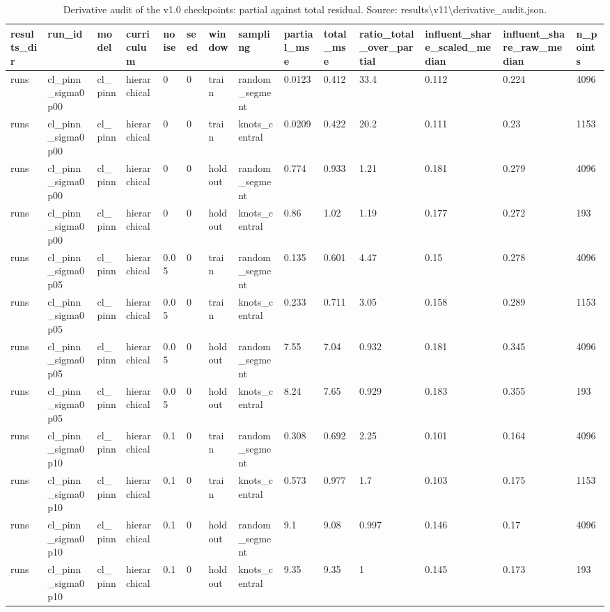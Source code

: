 \begin{table}[t]
\centering
\caption{Derivative audit of the v1.0 checkpoints: partial against total residual. Source: results\textbackslash{}v11\textbackslash{}derivative\_audit.json.}
\label{tab:si-derivative-audit}
\footnotesize
\begin{tabular}{llllllllllllll}
\toprule
results\_dir & run\_id & model & curriculum & noise & seed & window & sampling & partial\_mse & total\_mse & ratio\_total\_over\_partial & influent\_share\_scaled\_median & influent\_share\_raw\_median & n\_points \\
\midrule
runs & cl\_pinn\_sigma0p00 & cl\_pinn & hierarchical & 0 & 0 & train & random\_segment & 0.0123 & 0.412 & 33.4 & 0.112 & 0.224 & 4096 \\
runs & cl\_pinn\_sigma0p00 & cl\_pinn & hierarchical & 0 & 0 & train & knots\_central & 0.0209 & 0.422 & 20.2 & 0.111 & 0.23 & 1153 \\
runs & cl\_pinn\_sigma0p00 & cl\_pinn & hierarchical & 0 & 0 & holdout & random\_segment & 0.774 & 0.933 & 1.21 & 0.181 & 0.279 & 4096 \\
runs & cl\_pinn\_sigma0p00 & cl\_pinn & hierarchical & 0 & 0 & holdout & knots\_central & 0.86 & 1.02 & 1.19 & 0.177 & 0.272 & 193 \\
runs & cl\_pinn\_sigma0p05 & cl\_pinn & hierarchical & 0.05 & 0 & train & random\_segment & 0.135 & 0.601 & 4.47 & 0.15 & 0.278 & 4096 \\
runs & cl\_pinn\_sigma0p05 & cl\_pinn & hierarchical & 0.05 & 0 & train & knots\_central & 0.233 & 0.711 & 3.05 & 0.158 & 0.289 & 1153 \\
runs & cl\_pinn\_sigma0p05 & cl\_pinn & hierarchical & 0.05 & 0 & holdout & random\_segment & 7.55 & 7.04 & 0.932 & 0.181 & 0.345 & 4096 \\
runs & cl\_pinn\_sigma0p05 & cl\_pinn & hierarchical & 0.05 & 0 & holdout & knots\_central & 8.24 & 7.65 & 0.929 & 0.183 & 0.355 & 193 \\
runs & cl\_pinn\_sigma0p10 & cl\_pinn & hierarchical & 0.1 & 0 & train & random\_segment & 0.308 & 0.692 & 2.25 & 0.101 & 0.164 & 4096 \\
runs & cl\_pinn\_sigma0p10 & cl\_pinn & hierarchical & 0.1 & 0 & train & knots\_central & 0.573 & 0.977 & 1.7 & 0.103 & 0.175 & 1153 \\
runs & cl\_pinn\_sigma0p10 & cl\_pinn & hierarchical & 0.1 & 0 & holdout & random\_segment & 9.1 & 9.08 & 0.997 & 0.146 & 0.17 & 4096 \\
runs & cl\_pinn\_sigma0p10 & cl\_pinn & hierarchical & 0.1 & 0 & holdout & knots\_central & 9.35 & 9.35 & 1 & 0.145 & 0.173 & 193 \\

\end{tabular}
\end{table}
